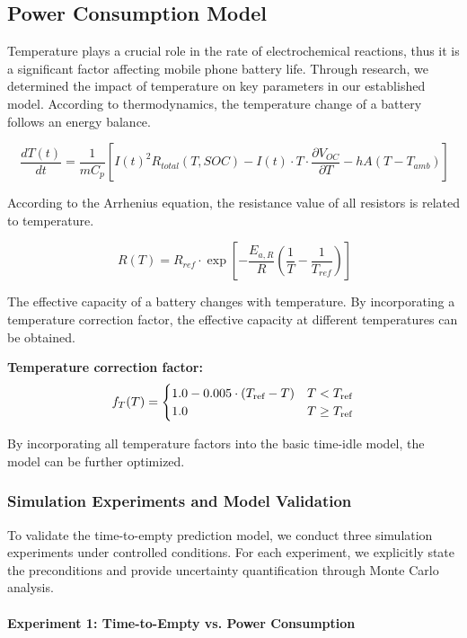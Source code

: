 \subsection{Power Consumption Model}
\label{subsec:power_model}

Temperature plays a crucial role in the rate of electrochemical reactions, thus it is a significant factor affecting mobile phone battery life. Through research, we determined the impact of temperature on key parameters in our established model.
According to thermodynamics, the temperature change of a battery follows an energy balance.

$$\ {\frac{dT(t)}{dt} = \frac{1}{mC_p}\left[I(t)^2 R_{total}(T, SOC) - I(t) \cdot T \cdot \frac{\partial V_{OC}}{\partial T} - hA(T - T_{amb})\right]}$$

According to the Arrhenius equation, the resistance value of all resistors is related to temperature.

$$\ {R(T) = R_{ref} \cdot \exp\left[-\frac{E_{a,R}}{R}\left(\frac{1}{T} - \frac{1}{T_{ref}}\right)\right]}$$

The effective capacity of a battery changes with temperature. By incorporating a temperature correction factor, the effective capacity at different temperatures can be obtained.

\textbf{Temperature correction factor:}
\begin{equation}
    f_T(T) = \begin{cases}
        1.0 - 0.005 \cdot (T_{\text{ref}} - T) & T < T_{\text{ref}} \\
        1.0 & T \geq T_{\text{ref}}
    \end{cases}
    \label{eq:temp_factor}
\end{equation}

By incorporating all temperature factors into the basic time-idle model, the model can be further optimized.

\subsubsection{Simulation Experiments and Model Validation}

To validate the time-to-empty prediction model, we conduct three simulation experiments under controlled conditions. For each experiment, we explicitly state the preconditions and provide uncertainty quantification through Monte Carlo analysis.

\paragraph{Experiment 1: Time-to-Empty vs. Power Consumption}

